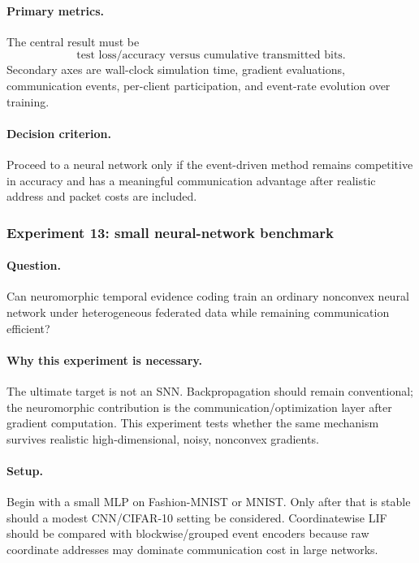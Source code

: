 \paragraph{Primary metrics.}
The central result must be
\begin{equation}
  \boxed{\text{test loss/accuracy versus cumulative transmitted bits}.}
\end{equation}
Secondary axes are wall-clock simulation time, gradient evaluations, communication events, per-client participation, and event-rate evolution over training.

\paragraph{Decision criterion.}
Proceed to a neural network only if the event-driven method remains competitive in accuracy and has a meaningful communication advantage after realistic address and packet costs are included.

\subsubsection{Experiment 13: small neural-network benchmark}

\paragraph{Question.}
Can neuromorphic temporal evidence coding train an ordinary nonconvex neural network under heterogeneous federated data while remaining communication efficient?

\paragraph{Why this experiment is necessary.}
The ultimate target is not an SNN. Backpropagation should remain conventional; the neuromorphic contribution is the communication/optimization layer after gradient computation. This experiment tests whether the same mechanism survives realistic high-dimensional, noisy, nonconvex gradients.

\paragraph{Setup.}
Begin with a small MLP on Fashion-MNIST or MNIST. Only after that is stable should a modest CNN/CIFAR-10 setting be considered. Coordinatewise LIF should be compared with blockwise/grouped event encoders because raw coordinate addresses may dominate communication cost in large networks.

